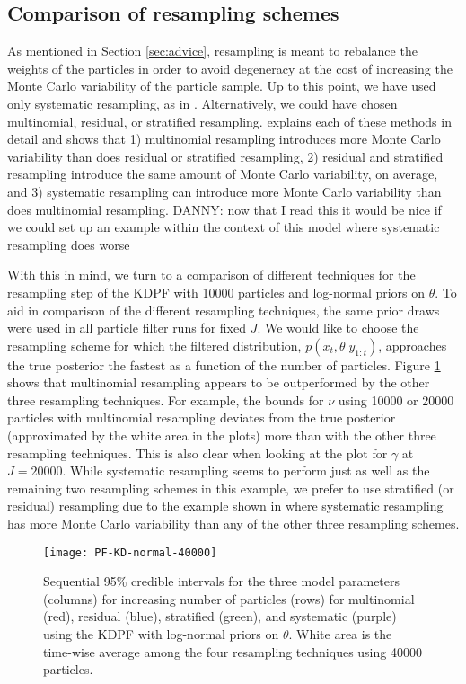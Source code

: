 \documentclass{elsarticle}
\newcommand{\danny}[1]{{\color{blue}DANNY: #1}}
\begin{document}
\subsection{Comparison of resampling schemes \label{sec:resample}}

As mentioned in Section \ref{sec:advice}, resampling is meant to rebalance the weights of the particles in order to avoid degeneracy at the cost of increasing the Monte Carlo variability of the particle sample.  Up to this point, we have used only systematic resampling, as in \citet{skvortsov2012monitoring}. Alternatively, we could have chosen multinomial, residual, or stratified resampling. \citet{Douc:Capp:Moul:comp:2005} explains each of these methods in detail and shows that 1) multinomial resampling introduces more Monte Carlo variability than does residual or stratified resampling, 2) residual and stratified resampling introduce the same amount of Monte Carlo variability, on average, and 3) systematic resampling can introduce more Monte Carlo variability than does multinomial resampling. \danny{now that I read this it would be nice if we could set up an example within the context of this model where systematic resampling does worse}

With this in mind, we turn to a comparison of different techniques for the resampling step of the KDPF with 10000 particles and log-normal priors on $\theta$. To aid in comparison of the different resampling techniques, the same prior draws were used in all particle filter runs for fixed $J$. We would like to choose the resampling scheme for which the filtered distribution, $p(x_t,\theta|y_{1:t})$, approaches the true posterior the fastest as a function of the number of particles. Figure \ref{fig:resamp} shows that multinomial resampling appears to be outperformed by the other three resampling techniques. For example, the bounds for $\nu$ using 10000 or 20000 particles with multinomial resampling deviates from the true posterior (approximated by the white area in the plots) more than with the other three resampling techniques. This is also clear when looking at the plot for $\gamma$ at $J = 20000$. While systematic resampling seems to perform just as well as the remaining two resampling schemes in this example, we prefer to use stratified (or residual) resampling due to the example shown in \cite{Douc:Capp:Moul:comp:2005} where systematic resampling has more Monte Carlo variability than any of the other three resampling schemes.

\begin{figure}
\centering
\texttt{[image: PF-KD-normal-40000]}
\caption{Sequential 95\% credible intervals for the three model parameters (columns) for increasing number of particles (rows) for multinomial (red), residual (blue), stratified (green), and systematic (purple) using the KDPF with log-normal priors on $\theta$. White area is the time-wise average among the four resampling techniques using 40000 particles.} \label{fig:resamp}
\end{figure}
\end{document}
